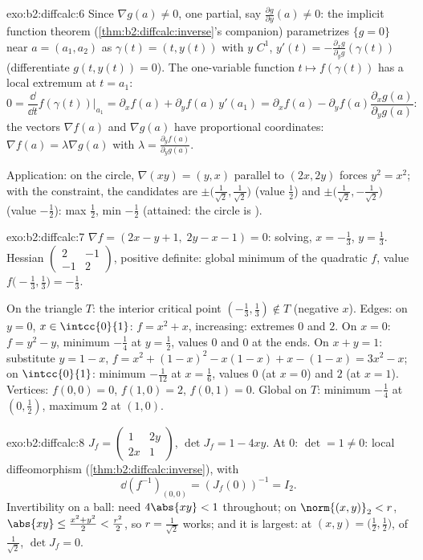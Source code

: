 \begin{solution}{exo:b2:diffcalc:6}
Since $\nabla g(a) \neq 0$, one partial, say $\frac{\partial
g}{\partial y}(a) \neq 0$: the implicit function theorem
(\cref{thm:b2:diffcalc:inverse}'s companion) parametrizes $\{g =
0\}$ near $a = (a_1, a_2)$ as $\gamma(t) = (t, y(t))$ with $y$
$C^1$, $y'(t) = -\frac{\partial_x g}{\partial_y g}(\gamma(t))$
(differentiate $g(t, y(t)) = 0$). The one-variable function $t
\mapsto f(\gamma(t))$ has a local extremum at $t = a_1$:
\[
0 = \frac{\dd}{\dd t}f(\gamma(t))\Big|_{a_1}
= \partial_x f(a) + \partial_y f(a)\,y'(a_1)
= \partial_x f(a) - \partial_yf(a)\frac{\partial_x
g(a)}{\partial_y g(a)} :
\]
the vectors $\nabla f(a)$ and $\nabla g(a)$ have proportional
coordinates: $\nabla f(a) = \lambda \nabla g(a)$ with $\lambda =
\frac{\partial_y f(a)}{\partial_y g(a)}$.

Application: on the circle, $\nabla(xy) = (y, x)$ parallel to
$(2x, 2y)$ forces $y^2 = x^2$; with the constraint, the candidates
are $\pm\bigl(\tfrac{1}{\sqrt2}, \tfrac{1}{\sqrt2}\bigr)$ (value
$\frac12$) and $\pm\bigl(\tfrac{1}{\sqrt2},
-\tfrac{1}{\sqrt2}\bigr)$ (value $-\frac12$): max $\frac12$, min
$-\frac12$ (attained: the circle is ).
\end{solution}

\begin{solution}{exo:b2:diffcalc:7}
$\nabla f = (2x - y + 1,\; 2y - x - 1) = 0$: solving, $x =
-\frac13$, $y = \frac13$. Hessian $\begin{pmatrix} 2 & -1\\ -1 &
2\end{pmatrix}$, positive definite: global minimum of the quadratic
$f$, value $f\bigl(-\frac13, \frac13\bigr) = -\frac13$.

On the triangle $T$: the interior critical point $(-\frac13,
\frac13) \notin T$ (negative $x$). Edges: on $y = 0$, $x \in
\intcc{0}{1}$: $f = x^2 + x$, increasing: extremes $0$ and $2$. On
$x = 0$: $f = y^2 - y$, minimum $-\frac14$ at $y = \frac12$, values
$0$ and $0$ at the ends. On $x + y = 1$: substitute $y = 1 - x$,
$f = x^2 + (1-x)^2 - x(1-x) + x - (1-x) = 3x^2 - x$; on
$\intcc{0}{1}$: minimum $-\frac{1}{12}$ at $x = \frac16$, values
$0$ (at $x=0$) and $2$ (at $x=1$). Vertices: $f(0,0) = 0$, $f(1,0)
= 2$, $f(0,1) = 0$. Global on $T$: minimum $-\frac14$ at $(0,
\frac12)$, maximum $2$ at $(1, 0)$.
\end{solution}

\begin{solution}{exo:b2:diffcalc:8}
$J_f = \begin{pmatrix} 1 & 2y\\ 2x & 1\end{pmatrix}$, $\det J_f =
1 - 4xy$. At $0$: $\det = 1 \neq 0$: local diffeomorphism
(\cref{thm:b2:diffcalc:inverse}), with
\[
\dd(f^{-1})_{(0,0)} = (J_f(0))^{-1} = I_2 .
\]
Invertibility on a ball: need $4\abs{xy} < 1$ throughout; on
$\norm{(x,y)}_2 < r$, $\abs{xy} \leq \frac{x^2 + y^2}{2} <
\frac{r^2}{2}$, so $r = \frac{1}{\sqrt2}$ works; and it is largest:
at $(x, y) = \bigl(\tfrac12, \tfrac12\bigr)$, of 
$\frac{1}{\sqrt2}$, $\det J_f = 0$.
\end{solution}

